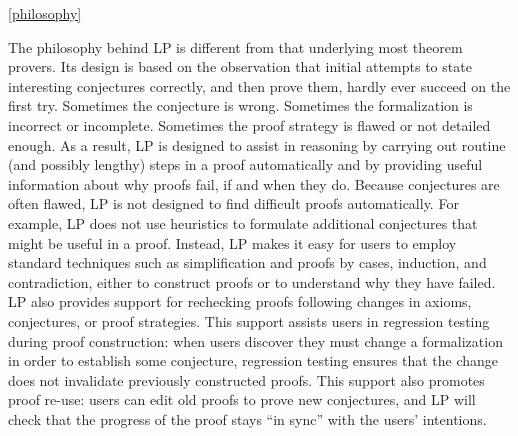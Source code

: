 \ref{philosophy}

The philosophy behind LP is different from that underlying most theorem
provers.  Its design is based on the observation that initial attempts to state
interesting conjectures correctly, and then prove them, hardly ever succeed on
the first try.  Sometimes the conjecture is wrong.  Sometimes the formalization
is incorrect or incomplete.  Sometimes the proof strategy is flawed or not
detailed enough.  As a result, LP is designed to assist in reasoning by
carrying out routine (and possibly lengthy) steps in a proof automatically and
by providing useful information about why proofs fail, if and when they do.
\p
Because conjectures are often flawed, LP is not designed to find difficult
proofs automatically.  For example, LP does not use heuristics to formulate
additional conjectures that might be useful in a proof.  Instead, LP makes it
easy for users to employ standard techniques such as simplification and proofs
by cases, induction, and contradiction, either to construct proofs or to
understand why they have failed.
\p
LP also provides support for rechecking proofs following changes in axioms,
conjectures, or proof strategies.  This support assists users in regression
testing during proof construction: when users discover they must change a
formalization in order to establish some conjecture, regression testing ensures
that the change does not invalidate previously constructed proofs.  This
support also promotes proof re-use: users can edit old proofs to prove new
conjectures, and LP will check that the progress of the proof stays ``in
sync'' with the users' intentions.

